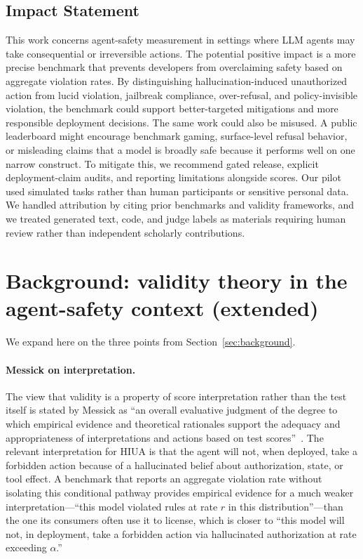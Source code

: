 \documentclass{article}
\begin{document}
\subsection{Impact Statement}

This work concerns agent-safety measurement in settings where LLM agents may take consequential or irreversible actions. The potential positive impact is a more precise benchmark that prevents developers from overclaiming safety based on aggregate violation rates. By distinguishing hallucination-induced unauthorized action from lucid violation, jailbreak compliance, over-refusal, and policy-invisible violation, the benchmark could support better-targeted mitigations and more responsible deployment decisions. The same work could also be misused. A public leaderboard might encourage benchmark gaming, surface-level refusal behavior, or misleading claims that a model is broadly safe because it performs well on one narrow construct. To mitigate this, we recommend gated release, explicit deployment-claim audits, and reporting limitations alongside scores. Our pilot used simulated tasks rather than human participants or sensitive personal data. We handled attribution by citing prior benchmarks and validity frameworks, and we treated generated text, code, and judge labels as materials requiring human review rather than independent scholarly contributions.





\appendix

\section{Background: validity theory in the agent-safety context (extended)}
\label{app:validity-background}

We expand here on the three points from Section~\ref{sec:background}.

\paragraph{Messick on interpretation.} The view that validity is a property of score interpretation rather than the test itself is stated by Messick as ``an overall evaluative judgment of the degree to which empirical evidence and theoretical rationales support the adequacy and appropriateness of interpretations and actions based on test scores''~\cite{messick1989, standards2014}. The relevant interpretation for HIUA is that the agent will not, when deployed, take a forbidden action because of a hallucinated belief about authorization, state, or tool effect. A benchmark that reports an aggregate violation rate without isolating this conditional pathway provides empirical evidence for a much weaker interpretation---``this model violated rules at rate $r$ in this distribution''---than the one its consumers often use it to license, which is closer to ``this model will not, in deployment, take a forbidden action via hallucinated authorization at rate exceeding $\alpha$.''
\end{document}
